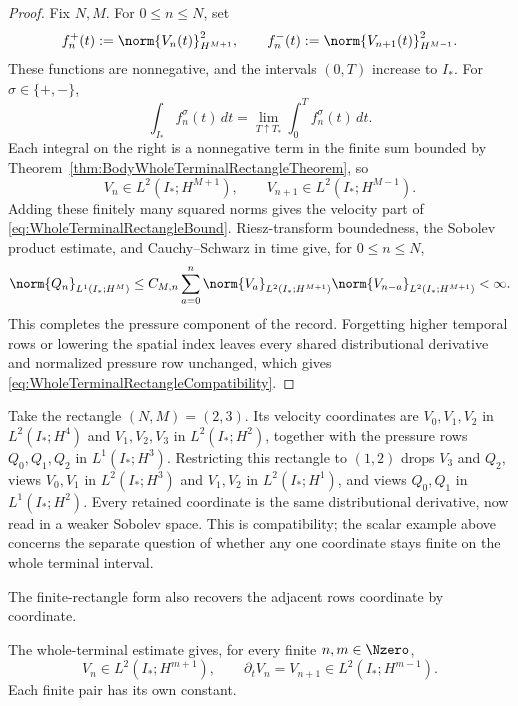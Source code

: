 \begin{proof}
Fix \(N,M\).
For \(0\leq n\leq N\), set
\[
  f_n^+(t):=\norm{V_n(t)}_{H^{M+1}}^2,
  \qquad
  f_n^-(t):=\norm{V_{n+1}(t)}_{H^{M-1}}^2.
\]
These functions are nonnegative, and the intervals \((0,T)\) increase to \(I_*\).
For \(\sigma\in\{+,-\}\),
\[
  \int_{I_*}f_n^\sigma(t)\,dt
  =
  \lim_{T\uparrow T_*}\int_0^T f_n^\sigma(t)\,dt.
\]
Each integral on the right is a nonnegative term in the finite sum bounded by Theorem~\ref{thm:BodyWholeTerminalRectangleTheorem}, so
\[
  V_n\in L^2(I_*;H^{M+1}),
  \qquad
  V_{n+1}\in L^2(I_*;H^{M-1}).
\]
Adding these finitely many squared norms gives the velocity part of \eqref{eq:WholeTerminalRectangleBound}.
Riesz-transform boundedness, the Sobolev product estimate, and Cauchy--Schwarz in time give, for \(0\leq n\leq N\),
\[
  \norm{Q_n}_{L^1(I_*;H^M)}
  \leq
  C_{M,n}\sum_{a=0}^{n}
  \norm{V_a}_{L^2(I_*;H^{M+1})}
  \norm{V_{n-a}}_{L^2(I_*;H^{M+1})}
  <\infty.
\]
This completes the pressure component of the record.
Forgetting higher temporal rows or lowering the spatial index leaves every shared distributional derivative and normalized pressure row unchanged, which gives \eqref{eq:WholeTerminalRectangleCompatibility}.
\end{proof}

Take the rectangle \((N,M)=(2,3)\).
Its velocity coordinates are \(V_0,V_1,V_2\) in \(L^2(I_*;H^4)\) and \(V_1,V_2,V_3\) in \(L^2(I_*;H^2)\), together with the pressure rows \(Q_0,Q_1,Q_2\) in \(L^1(I_*;H^3)\).
Restricting this rectangle to \((1,2)\) drops \(V_3\) and \(Q_2\), views \(V_0,V_1\) in \(L^2(I_*;H^3)\) and \(V_1,V_2\) in \(L^2(I_*;H^1)\), and views \(Q_0,Q_1\) in \(L^1(I_*;H^2)\).
Every retained coordinate is the same distributional derivative, now read in a weaker Sobolev space.
This is compatibility; the scalar example above concerns the separate question of whether any one coordinate stays finite on the whole terminal interval.

The finite-rectangle form also recovers the adjacent rows coordinate by coordinate.
\begin{proposition}\label{prop:AdjacentRowRecovery}
The whole-terminal estimate gives, for every finite \(n,m\in\Nzero\),
\begin{equation}\label{eq:WholeTerminalAdjacentRows}
  V_n\in L^2(I_*;H^{m+1}),
  \qquad
  \partial_tV_n=V_{n+1}\in L^2(I_*;H^{m-1}).
\end{equation}
Each finite pair has its own constant.
\end{proposition}

